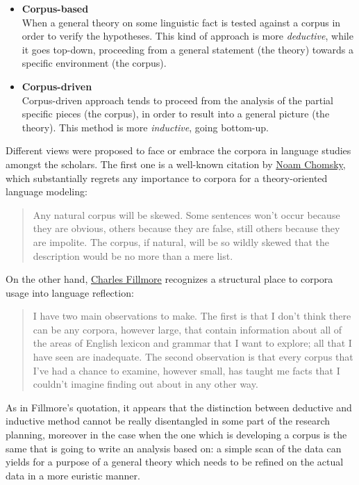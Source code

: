 \documentclass[a4paper,twoside,12pt,chapterprefix=false,bibliography=totocnumbered,listof=flat]{scrbook}
\theoremstyle{definition}
\theoremstyle{definition}
\theoremstyle{definition}
\theoremstyle{remark}
\begin{document}
\begin{itemize}
\item
  \textbf{Corpus-based}\\
  When a general theory on some linguistic fact is tested against a
  corpus in order to verify the hypotheses. This kind of approach is
  more \emph{deductive}, while it goes top-down, proceeding from a
  general statement (the theory) towards a specific environment (the
  corpus).
\item
  \textbf{Corpus-driven}\\
  Corpus-driven approach tends to proceed from the analysis of the
  partial specific pieces (the corpus), in order to result into a
  general picture (the theory). This method is more \emph{inductive},
  going bottom-up.
\end{itemize}

Different views were proposed to face or embrace the corpora in language
studies amongst the scholars. The first one is a well-known citation by
\href{https://en.wikipedia.org/wiki/Noam_Chomsky}{Noam Chomsky}, which
substantially regrets any importance to corpora for a theory-oriented
language modeling:

\begin{quote}
Any natural corpus will be skewed. Some sentences won't occur because
they are obvious, others because they are false, still others because
they are impolite. The corpus, if natural, will be so wildly skewed that
the description would be no more than a mere list. \citep[Chomsky 1962,
\emph{A transformational approach to syntax} in][]{togninibonelli2001}
\end{quote}

On the other hand,
\href{https://en.wikipedia.org/wiki/Charles_J._Fillmore}{Charles
Fillmore} recognizes a structural place to corpora usage into language
reflection:

\begin{quote}
I have two main observations to make. The first is that I don't think
there can be any corpora, however large, that contain information about
all of the areas of English lexicon and grammar that I want to explore;
all that I have seen are inadequate. The second observation is that
every corpus that I've had a chance to examine, however small, has
taught me facts that I couldn't imagine finding out about in any other
way. \citep{fillmore1992}
\end{quote}

As in Fillmore's quotation, it appears that the distinction between
deductive and inductive method cannot be really disentangled in some
part of the research planning, moreover in the case when the one which
is developing a corpus is the same that is going to write an analysis
based on: a simple scan of the data can yields for a purpose of a
general theory which needs to be refined on the actual data in a more
euristic manner.
\end{document}
